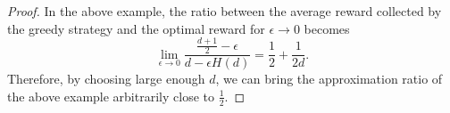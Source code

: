 \begin{proof}
In the above example, the ratio between the average reward collected by the greedy strategy and the optimal reward for $\epsilon \to 0$ becomes
$$
\lim_{\epsilon \to 0} \frac{\frac{d+1}{2} - \epsilon}{d - \epsilon H(d)} = \frac{1}{2} + \frac{1}{2d}.
$$
Therefore, by choosing large enough $d$, we can bring the approximation ratio of the above example arbitrarily close to $\frac{1}{2}$.
\end{proof}